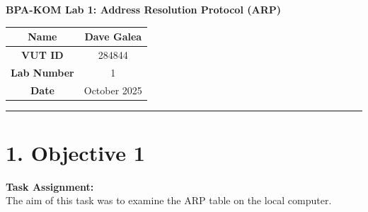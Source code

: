 \documentclass[a4paper,12pt]{article}
\begin{document}
\begin{center}
    {\Large \textbf{BPA-KOM Lab 1: Address Resolution Protocol (ARP)}}\\[1em]
\end{center}

\begin{center}
\begin{tabular}{|c|c|}
\hline
\textbf{Name} & Dave Galea \\ \hline
\textbf{VUT ID} & 284844 \\ \hline
\textbf{Lab Number} & 1 \\ \hline
\textbf{Date} & October 2025 \\ \hline
\end{tabular}
\end{center}

\vspace{0.5cm}
\hrule
\vspace{0.5cm}


\section*{1. Objective 1}

\textbf{Task Assignment:} \\
The aim of this task was to examine the ARP table on the local computer.
\end{document}
